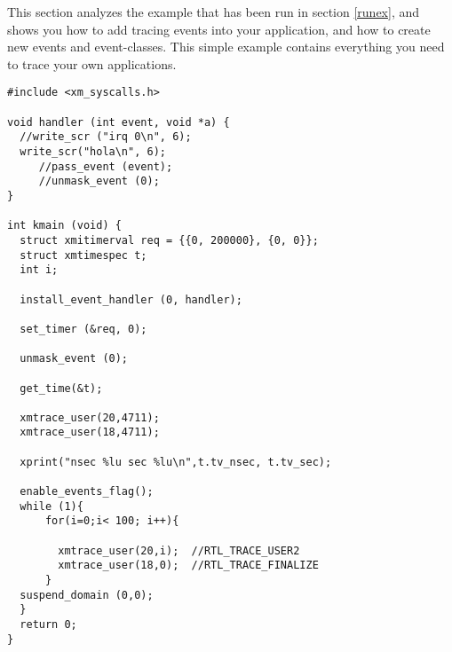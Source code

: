This section analyzes the example that has been run in section \ref{runex}, and shows you how to
add tracing events into your application, and how to create new events and event-classes. This simple
example contains everything you need to trace your own applications.

\lstset{language=C}
\begin{lstlisting}
#include <xm_syscalls.h>

void handler (int event, void *a) {
  //write_scr ("irq 0\n", 6);
  write_scr("hola\n", 6);
     //pass_event (event);
     //unmask_event (0);
}

int kmain (void) {
  struct xmitimerval req = {{0, 200000}, {0, 0}};
  struct xmtimespec t;
  int i;

  install_event_handler (0, handler);
  
  set_timer (&req, 0);

  unmask_event (0);

  get_time(&t);

  xmtrace_user(20,4711);
  xmtrace_user(18,4711);

  xprint("nsec %lu sec %lu\n",t.tv_nsec, t.tv_sec);
  
  enable_events_flag();
  while (1){
	  for(i=0;i< 100; i++){
			  
  		xmtrace_user(20,i);  //RTL_TRACE_USER2
  		xmtrace_user(18,0);  //RTL_TRACE_FINALIZE
	  }
  suspend_domain (0,0);
  }
  return 0;
}


\end{lstlisting}

